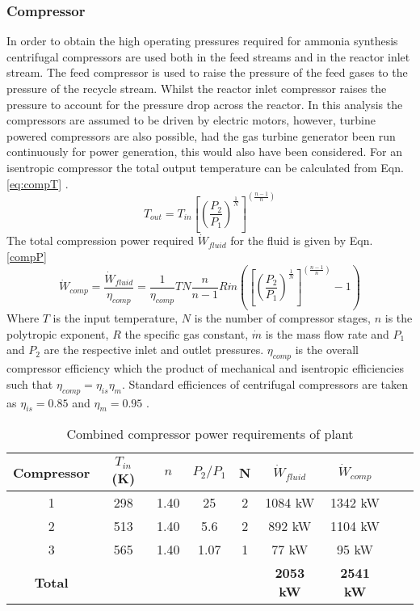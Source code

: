\subsubsection{Compressor}
In order to obtain the high operating pressures required for ammonia synthesis centrifugal compressors are used both in the feed streams and in the reactor inlet stream. The feed compressor is used to raise the pressure of the feed gases to the pressure of the recycle stream. Whilst the reactor inlet compressor raises the pressure to account for the pressure drop across the reactor. In this analysis the compressors are assumed to be driven by electric motors, however, turbine powered compressors are also possible, had the gas turbine generator been run continuously for power generation, this would also have been considered. 
For an isentropic compressor the total output temperature can be calculated from Eqn. \ref{eq:compT} \cite{Morgan2013}.
\begin{equation}
\label{eq:compT}
T_{out} = T_{in}\left[ \left( \frac{P_2}{P_1}\right)^{\frac{1}{N}} \right]^{\left( \frac{n-1}{n}\right)} 
\end{equation}
The total 
compression power required $\dot W_{fluid}$ for the fluid is given by Eqn. \ref{compP}
\begin{equation}
\label{eq:compP}
\dot W_{comp} = \frac{ \dot W_{fluid}}{\eta_{comp}} = \frac{1}{\eta_{comp}} TN\frac{n}{n-1}R\dot m \left( \left[ \left( \frac{P_2}{P_1}\right)^{\frac{1}{N}} \right]^{\left( \frac{n-1}{n}\right)} - 1 \right)
\end{equation}
Where $T$ is the input temperature, $N$ is the number of compressor stages, $n$ is the polytropic exponent, $R$ the specific gas constant, $\dot m$ is the mass flow rate and $P_1$ and $P_2$ are the respective inlet and outlet pressures. $\eta_{comp}$ is the overall compressor efficiency which the product of mechanical and isentropic efficiencies such that $\eta_{comp} =\eta_{is}\eta_{m}$. Standard efficiences of centrifugal compressors are taken as $\eta_{is} = 0.85$ and $\eta_m = 0.95$ \cite{Penkuhn2017}. 

\begin{table}[!htbp]
	\begin{center}
		\label{tab:power}
		\caption{Combined compressor power requirements of plant}
		
		\begin{tabular}{|c|c|c|c|c|c|c|c|c|}
			\hline
			Compressor& $T_{in}$ (K)& $n$ & $P_2/P_1$ & N & $\dot{W}_{fluid}$ & $\dot{W}_{comp}$\\ \hline
			1      &298          & 1.40                & 25 &2 & 1084 kW & 1342 kW\\ \hline
			2& 513 &  1.40 & 5.6  & 2& 892 kW & 1104 kW\\ \hline
			3      & 565         & 1.40                 & 1.07 &1 &77 kW & 95 kW \\ \hline
				\textbf{Total}      &          &                  &  &  & \textbf{2053 kW}&\textbf{2541 kW}  \\ \hline
		\end{tabular}
		
	\end{center}
\end{table}

